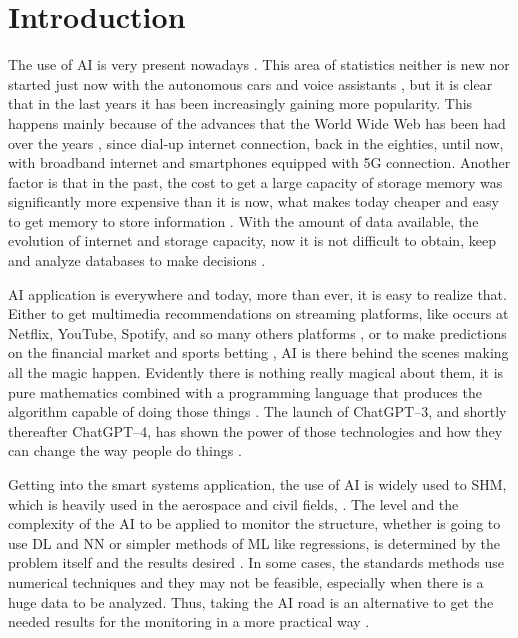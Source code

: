 \chapter{Introduction}

The use of AI is very present nowadays \cite{lee2020,poola2017,rabunal2006}. 
This area of statistics neither is new nor started just now with the autonomous cars and voice assistants \cite{muthukrishnan2020}, but it is clear that in the last years it has been increasingly gaining more popularity. 
This happens mainly because of the advances that the World Wide Web has been had over the years \cite{leiner2009,cohen-almagor2011}, since dial-up internet connection, back in the eighties, until now, with broadband internet and smartphones equipped with 5G connection. 
Another factor is that in the past, the cost to get a large capacity of storage memory was significantly more expensive than it is now, what makes today cheaper and easy to get memory to store information \cite{goda2012}. 
With the amount of data available, the evolution of  internet and storage capacity, now it is not difficult to obtain, keep and analyze databases to make decisions \cite{duan2019}.

AI application is everywhere and today, more than ever, it is easy to realize that. 
Either to get multimedia recommendations on streaming platforms, like occurs at Netflix, YouTube, Spotify, and so many others platforms \cite{chan-olmsted2019}, or to make predictions on the financial market and sports betting \cite{milana2021,kollar2021,hubacek2019}, AI is there behind the scenes making all the magic happen. 
Evidently there is nothing really magical about them, it is pure mathematics combined with a programming language that produces the algorithm capable of doing those things \cite{goodfellow2016,aurelien2022,raschka2015,raschka2022}.
The launch of ChatGPT--3, and shortly thereafter ChatGPT--4, has shown the power of those technologies and how they can change the way people do things \cite{biswas2023,biswas2023a, lund2023,baidoo-anu2023}.

Getting into the smart systems application, the use of AI is widely used to SHM, which is heavily used in the aerospace and civil fields, \cite{azimi2020,ye2019}. 
The level and the complexity of the AI to be applied to monitor the structure, whether is going to use DL and NN or simpler methods of ML like regressions, is determined by the problem itself and the results desired \cite{farrar2012}. 
In some cases, the standards methods use numerical techniques and they may not be feasible, especially when there is a huge data to be analyzed. 
Thus, taking the AI road is an alternative to get the needed results for the monitoring in a more practical way \cite{smarsly2007,sun2020}. 

